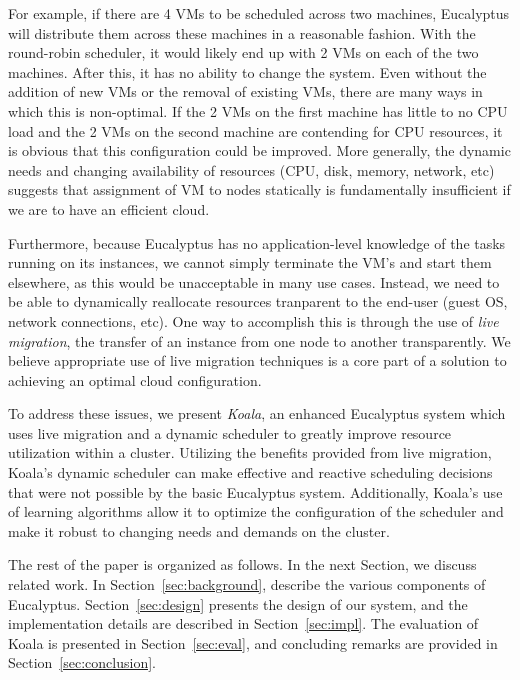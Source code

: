 For example, if there are 4 VMs to be scheduled across two machines, Eucalyptus will distribute them across these machines in a reasonable fashion.  With the round-robin scheduler, it would likely end up with 2 VMs on each of the two machines.  After this, it has no ability to change the system.  Even without the addition of new VMs or the removal of existing VMs, there are many ways in which this is non-optimal.  If the 2 VMs on the first machine has little to no CPU load and the 2 VMs on the second machine are contending for CPU resources, it is obvious that this configuration could be improved.  More generally, the dynamic needs and changing availability of resources (CPU, disk, memory, network, etc) suggests that assignment of VM to nodes statically is fundamentally insufficient if we are to have an efficient cloud.

Furthermore, because Eucalyptus has no application-level knowledge of the tasks running on its instances, we cannot simply terminate the VM's and start them elsewhere, as this would be unacceptable in many use cases.  Instead, we need to be able to dynamically reallocate resources tranparent to the end-user (guest OS, network connections, etc).  One way to accomplish this is through the use of \emph{live migration}, the transfer of an instance from one node to another transparently.  We believe appropriate use of live migration techniques is a core part of a solution to achieving an optimal cloud configuration.


To address these issues, we present \emph{Koala}, an enhanced Eucalyptus system which uses live migration and a dynamic scheduler to greatly improve resource utilization within a cluster.  Utilizing the benefits provided from live migration, Koala's dynamic scheduler can make effective and reactive scheduling decisions that were not possible by the basic Eucalyptus system.  Additionally, Koala's use of learning algorithms allow it to optimize the configuration of the scheduler and make it robust to changing needs and demands on the cluster.

The rest of the paper is organized as follows.  In the next Section, we discuss related work.  In Section~\ref{sec:background}, describe the various components of Eucalyptus.  Section~\ref{sec:design} presents the design of our system, and the implementation details are described in Section~\ref{sec:impl}.  The evaluation of Koala is presented in Section~\ref{sec:eval}, and concluding remarks are provided in Section~\ref{sec:conclusion}.%
